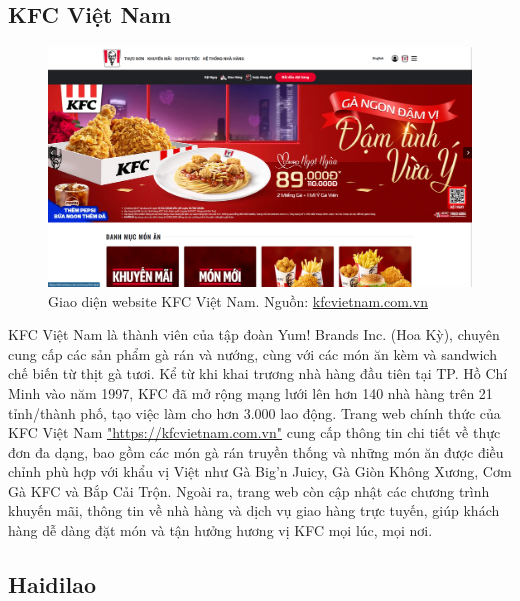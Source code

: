 \subsection{KFC Việt Nam}

\begin{figure}[H]
    \centering
    \includegraphics[width=15cm]{Images/kfc.png}
    \vspace{0.5cm}
    \caption{Giao diện website KFC Việt Nam. Nguồn: \href{https://kfcvietnam.com.vn}{kfcvietnam.com.vn}}
    \label{fig:my_label}
\end{figure}

KFC Việt Nam là thành viên của tập đoàn Yum! Brands Inc. (Hoa Kỳ), chuyên cung cấp các sản phẩm gà rán và nướng, cùng với các món ăn kèm và sandwich chế biến từ thịt gà tươi. Kể từ khi khai trương nhà hàng đầu tiên tại TP. Hồ Chí Minh vào năm 1997, KFC đã mở rộng mạng lưới lên hơn 140 nhà hàng trên 21 tỉnh/thành phố, tạo việc làm cho hơn 3.000 lao động. Trang web chính thức của KFC Việt Nam \href{https://kfcvietnam.com.vn}{"https://kfcvietnam.com.vn"} cung cấp thông tin chi tiết về thực đơn đa dạng, bao gồm các món gà rán truyền thống và những món ăn được điều chỉnh phù hợp với khẩu vị Việt như Gà Big'n Juicy, Gà Giòn Không Xương, Cơm Gà KFC và Bắp Cải Trộn. Ngoài ra, trang web còn cập nhật các chương trình khuyến mãi, thông tin về nhà hàng và dịch vụ giao hàng trực tuyến, giúp khách hàng dễ dàng đặt món và tận hưởng hương vị KFC mọi lúc, mọi nơi.

\subsection{Haidilao}

